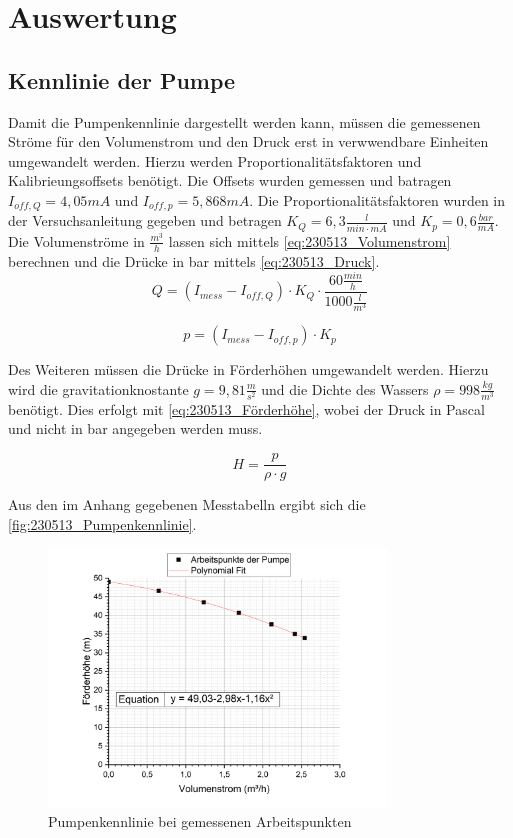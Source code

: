 \section{Auswertung}
\subsection{Kennlinie der Pumpe} \label{sec:230514_Kennlinie_der_Pumpe}
Damit die Pumpenkennlinie dargestellt werden kann, müssen die gemessenen Ströme für den Volumenstrom und den Druck erst in verwwendbare Einheiten umgewandelt werden. 
Hierzu werden Proportionalitätsfaktoren und Kalibrieungsoffsets benötigt. 
Die Offsets wurden gemessen und batragen $I_{off,Q}=4,05 mA$ und $I_{off,p}=5,868 mA$.
Die Proportionalitätsfaktoren wurden in der Versuchsanleitung gegeben und betragen $K_Q = 6,3 \frac{l}{min \cdot mA}$ und $K_p = 0,6 \frac{bar}{mA}$.
Die Volumenströme in $\frac{m^3}{h}$ lassen sich mittels \autoref{eq:230513_Volumenstrom} berechnen und die Drücke in bar mittels \autoref{eq:230513_Druck}.
\begin{equation}
  Q = (I_{mess}-I_{off,Q})\cdot K_Q \cdot \frac{60\frac{min}{h}}{1000\frac{l}{m^3}}
  \label{eq:230513_Volumenstrom}
\end{equation}

\begin{equation}
  p = (I_{mess}-I_{off,p})\cdot K_p
  \label{eq:230513_Druck}
\end{equation}

Des Weiteren müssen die Drücke in Förderhöhen umgewandelt werden. Hierzu wird die gravitationknostante $g = 9,81 \frac{m}{s^2}$ und die Dichte des Wassers $\rho = 998 \frac{kg}{m^3}$ benötigt.
Dies erfolgt mit \autoref{eq:230513_Förderhöhe}, wobei der Druck in Pascal und nicht in bar angegeben werden muss.

\begin{equation}
  H = \frac{p}{\rho \cdot g}
  \label{eq:230513_Förderhöhe}
\end{equation}

Aus den im Anhang gegebenen Messtabelln ergibt sich die \autoref{fig:230513_Pumpenkennlinie}.
\begin{figure}[H]
  \centering
  \includegraphics[width=0.8\textwidth]{Abbildungen/Pumpenkennlinie.png}
  \caption{Pumpenkennlinie bei gemessenen Arbeitspunkten}
  \label{fig:230513_Pumpenkennlinie}
\end{figure}

